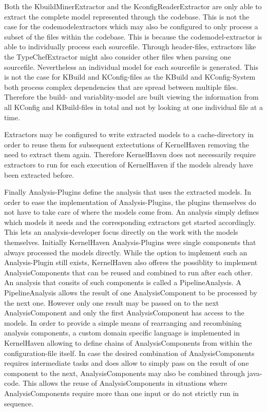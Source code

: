 \documentclass[a4paper]{article}
\begin{document}
Both the KbuildMinerExtractor and the KconfigReaderExtractor are only able to extract the complete model represented through the codebase. This is not the case for the codemodelextractors which may also be configured to only process a subset of the files within the codebase. This is because the codemodel-extractor is able to individually process each sourcefile. Through header-files, extractors like the TypeChefExtractor might also consider other files when parsing one sourcefile. Nevertheless an individual model for each sourcefile is generated. This is not the case for KBuild and KConfig-files as the KBuild and KConfig-System both process complex dependencies that are spread between multiple files. Therefore the build- and variablity-model are built viewing the information from all KConfig and KBuild-files in total and not by looking at one individual file at a time.

Extractors may be configured to write extracted models to a cache-directory in order to reuse them for subsequent extectutions of KernelHaven removing the need to extract them again. Therefore KernelHaven does not necessarily require extractors to run for each execution of KernelHaven if the models already have been extracted before.

Finally Analysis-Plugins define the analysis that uses the extracted models. In order to ease the implementation of Analysis-Plugins, the plugins themselves do not have to take care of where the models come from. An analysis simply defines which models it needs and the corresponding extractors get started accordingly. This lets an analysis-developer focus directly on the work with the models themselves. Initially KernelHaven Analysis-Plugins  were single components that always processed the models directly. While the option to implement such an Analysis-Plugin still exists, KernelHaven also offeres the possiblity to implement AnalysisComponents that can be reused and combined to run after each other. An analysis that consits of such components is called a PipelineAnalysis. A PipelineAnalysis allows the result of one AnalysisComponent to be processed by the next one.  However only one result may be passed on to the next AnalysisComponent and only the first AnalysisComponent has access to the models. In order to provide a simple means of rearranging and recombining analysis components, a custom domain specific language is implemented in KernelHaven allowing to define chains of AnalysisComponents from within the configuration-file itself. In case the desired combination of AnalysisComponents requires intermediate tasks and does allow to simply pass on the result of one component to the next, AnalysisComponents may also be combined through java-code. This allows the reuse of AnalysisComponents in situations where  AnalysisComponents require more than one input or do not strictly run in sequence.
\end{document}
